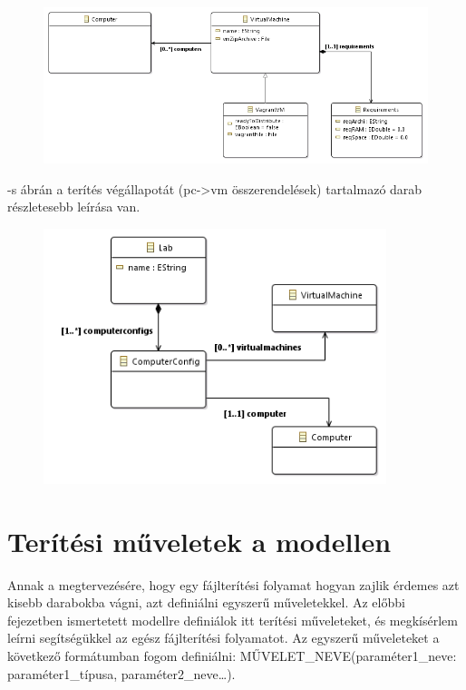 \begin{figure}[ht]
	\centering
	\includegraphics[width=130mm, keepaspectratio]{figures/design_vm.png}
	\caption{}
	\label{fig:designvm}
\end{figure}

-s ábrán a terítés végállapotát (pc->vm összerendelések) tartalmazó darab részletesebb leírása van.

\begin{figure}[h!]
	\centering
	\includegraphics[width=100mm, keepaspectratio]{figures/design_lab.png}
	\caption{}
	\label{fig:designlab}
\end{figure}

\section{Terítési műveletek a modellen}

Annak a megtervezésére, hogy egy fájlterítési folyamat hogyan zajlik érdemes azt kisebb darabokba vágni, azt definiálni egyszerű műveletekkel.
Az előbbi fejezetben ismertetett modellre definiálok itt terítési műveleteket, és megkísérlem leírni segítségükkel az egész fájlterítési folyamatot.
Az egyszerű műveleteket a következő formátumban fogom definiálni: MŰVELET\_NEVE(paraméter1\_neve: paraméter1\_típusa, paraméter2\_neve\ldots).

